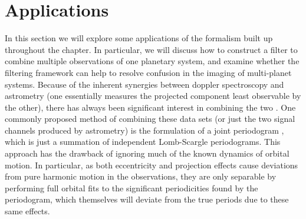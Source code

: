 \section{Applications}\label{sec:filterApplications}
In this section we will explore some applications of the formalism built up throughout the chapter.  In particular, we will discuss how to construct a filter to combine multiple observations of one planetary system, and examine whether the filtering framework can help to resolve confusion in the imaging of multi-planet systems.  Because of the inherent synergies between doppler spectroscopy and astrometry (one essentially measures the projected component least observable by the other), there has always been significant interest in combining the two \citep{sozzetti2005}.  One commonly proposed method of combining these data sets (or just the two signal channels produced by astrometry) is the formulation of a joint periodogram \citep{catanzarite2006}, which is just a summation of independent Lomb-Scargle periodograms.  This approach has the drawback of ignoring much of the known dynamics of orbital motion.  In particular, as both eccentricity and projection effects cause deviations from pure harmonic motion in the observations, they are only separable by performing full orbital fits to the significant periodicities found by the periodogram, which themselves will deviate from the true periods due to these same effects.

